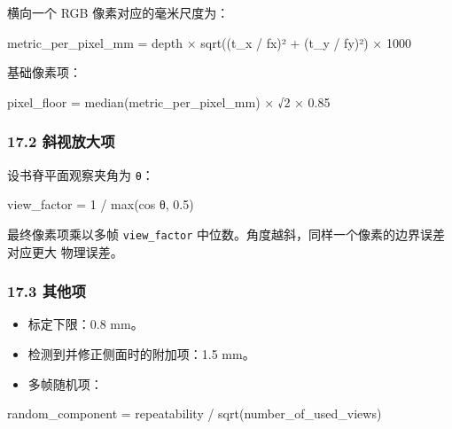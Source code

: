 \documentclass[
  chinese,
  11pt,
  a4paper,
]{article}
\newenvironment{Shaded}{\begin{snugshade}}{\end{snugshade}}
\newcommand{\NormalTok}[1]{#1}
\providecommand{\tightlist}{%
  \setlength{\itemsep}{0pt}\setlength{\parskip}{0pt}}
\begin{document}
横向一个 RGB 像素对应的毫米尺度为：

\begin{Shaded}
\begin{Highlighting}[]
\NormalTok{metric\_per\_pixel\_mm =}
\NormalTok{  depth}
\NormalTok{  × sqrt((t\_x / fx)² + (t\_y / fy)²)}
\NormalTok{  × 1000}
\end{Highlighting}
\end{Shaded}

基础像素项：

\begin{Shaded}
\begin{Highlighting}[]
\NormalTok{pixel\_floor =}
\NormalTok{  median(metric\_per\_pixel\_mm)}
\NormalTok{  × √2}
\NormalTok{  × 0.85}
\end{Highlighting}
\end{Shaded}

\subsubsection{17.2
斜视放大项}\label{172-ux659cux89c6ux653eux5927ux9879}

设书脊平面观察夹角为 \texttt{θ}：

\begin{Shaded}
\begin{Highlighting}[]
\NormalTok{view\_factor = 1 / max(cos θ, 0.5)}
\end{Highlighting}
\end{Shaded}

最终像素项乘以多帧 \texttt{view\_factor}
中位数。角度越斜，同样一个像素的边界误差对应更大 物理误差。

\subsubsection{17.3 其他项}\label{173-ux5176ux4ed6ux9879}

\begin{itemize}
\tightlist
\item
  标定下限：0.8 mm。
\item
  检测到并修正侧面时的附加项：1.5 mm。
\item
  多帧随机项：
\end{itemize}

\begin{Shaded}
\begin{Highlighting}[]
\NormalTok{random\_component = repeatability / sqrt(number\_of\_used\_views)}
\end{Highlighting}
\end{Shaded}
\end{document}
